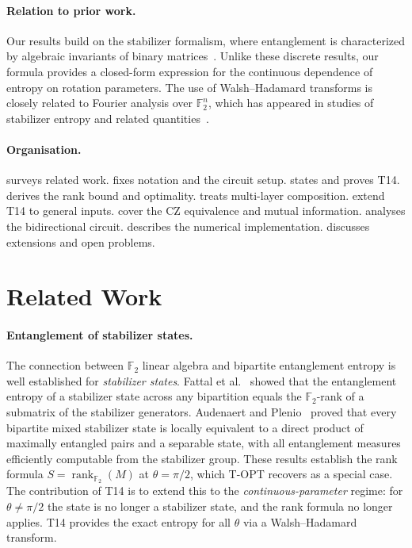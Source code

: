 \documentclass[11pt,a4paper]{article}
\newcommand{\F}{\mathbb{F}}
\newcommand{\rk}{\operatorname{rank}_{\F_2}}
\newcommand{\VNE}{S}
\begin{document}
\paragraph{Relation to prior work.}
Our results build on the stabilizer formalism, where entanglement is
characterized by algebraic invariants of binary
matrices~\cite{audenaert2005entanglement,fattal2004entanglement}.  Unlike
these discrete results, our formula provides a closed-form expression for the
continuous dependence of entropy on rotation parameters.  The use of
Walsh--Hadamard transforms is closely related to Fourier analysis over
$\F_2^n$, which has appeared in studies of stabilizer entropy and related
quantities~\cite{bataille2022cnot,goodenough2024noisy}.

\paragraph{Organisation.}
 surveys related work.
 fixes notation and the circuit setup.
 states and proves T14.
 derives the rank bound and optimality.
 treats multi-layer composition.
 extend T14 to general inputs.
 cover the CZ equivalence and mutual information.
 analyses the bidirectional circuit.
 describes the numerical implementation.
 discusses extensions and open problems.

\section{Related Work}
\label{sec:related}

\paragraph{Entanglement of stabilizer states.}
The connection between $\F_2$ linear algebra and bipartite entanglement entropy
is well established for \emph{stabilizer states}.  Fattal et
al.~\cite{fattal2004entanglement} showed that the entanglement entropy of a
stabilizer state across any bipartition equals the $\F_2$-rank of a submatrix
of the stabilizer generators.  Audenaert and
Plenio~\cite{audenaert2005entanglement} proved that every bipartite mixed
stabilizer state is locally equivalent to a direct product of maximally
entangled pairs and a separable state, with all entanglement measures
efficiently computable from the stabilizer group.  These results establish the
rank formula $\VNE = \rk(M)$ at $\theta = \pi/2$, which T-OPT recovers as a
special case.  The contribution of T14 is to extend this to the
\emph{continuous-parameter} regime: for $\theta \neq \pi/2$ the state is no
longer a stabilizer state, and the rank formula no longer applies.  T14
provides the exact entropy for all $\theta$ via a Walsh--Hadamard transform.
\end{document}
